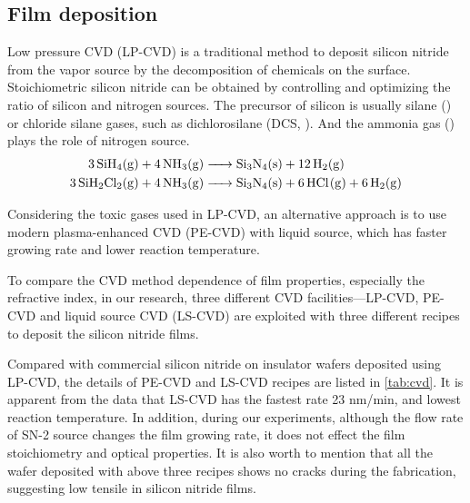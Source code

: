 \subsection{Film deposition}

Low pressure CVD (LP-CVD) is a traditional method to deposit silicon nitride from the vapor source by the decomposition of chemicals on the surface.  
Stoichiometric silicon nitride can be obtained by controlling and optimizing the ratio of silicon and nitrogen sources. 
The precursor of silicon is usually silane () or chloride silane gases, such as dichlorosilane (DCS, ). And the ammonia gas () plays the role of nitrogen source. 
\begin{align*}
    \ce{3SiH4(g) + 4NH3(g) &-> Si3N4(s) + 12H2(g)} \\
    \ce{3SiH2Cl2(g) + 4NH3(g) &-> Si3N4(s) + 6HCl(g) + 6H2(g)}
\end{align*}

Considering the toxic gases used in LP-CVD, an alternative approach is to use modern plasma-enhanced CVD (PE-CVD) with liquid source, which has faster growing rate and lower reaction temperature. 


To compare the CVD method dependence of film properties, especially the refractive index, in our research, three different CVD facilities---LP-CVD, PE-CVD and liquid source CVD (LS-CVD) are exploited with three different recipes to deposit the silicon nitride films.

Compared with commercial silicon nitride on insulator wafers deposited using LP-CVD,
the details of PE-CVD and LS-CVD recipes are listed in \autoref{tab:cvd}. It is apparent from the data that LS-CVD has the fastest rate 23 nm/min, and lowest reaction temperature. In addition, during our experiments, although the flow rate of SN-2 source changes the film growing rate, it does not effect the film stoichiometry and optical properties. 
It is also worth to mention that all the wafer deposited with above three recipes shows no cracks during the fabrication, suggesting low tensile in silicon nitride films.

